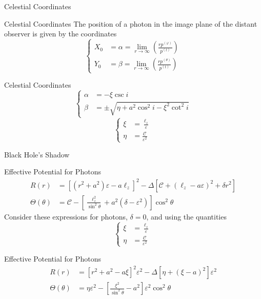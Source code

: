 \documentclass{beamer}
\begin{document}
\begin{darkframes}
\begin{frame}
	\huge
    {Celestial Coordinates}
\end{frame}

\begin{frame}{Celestial Coordinates}
	The position of a photon in the image plane of the distant observer is given by the coordinates 
	\[\begin{cases}
	X_0 &= \alpha = \lim_{r\rightarrow\infty} \left( \frac{rp^{(\varphi)}}{p^{(t)}} \right) \\
	Y_0 &= \beta = \lim_{r\rightarrow\infty} \left( \frac{rp^{(\theta)}}{p^{(t)}} \right)
	\end{cases}\]
\end{frame}

\begin{frame}{Celestial Coordinates}
	\[\begin{cases}
	\alpha &= -\xi \csc i\\	
	\beta &= \pm \sqrt{\eta + a^2 \cos^2 i - \xi^2 \cot^2 i}
	\end{cases}\]
	\pause
	\[\begin{cases}
    \xi &= \frac{\ell_z}{\varepsilon}\\
    \eta &= \frac{\mathcal{C}}{\varepsilon^2}
	\end{cases}\]
\end{frame}


\begin{frame}
	\huge
    {Black Hole's Shadow}
\end{frame}

\begin{frame}{Effective Potential for Photons}
    \begin{align*}
    R(r) &= \left[ (r^2 +a^2) \varepsilon - a \ell_z \right]^2 - \Delta \left[\mathcal{C} + (\ell_z - a \varepsilon)^2 + \delta r^2 \right]\\
	\Theta(\theta) &= \mathcal{C} - \left[ \frac{\ell_z^2}{\sin^2 \theta} + a^2 \left(\delta - \varepsilon^2 \right) \right] \cos^2 \theta
    \end{align*}
    \pause
    Consider these expressions for photons, $\delta=0$, and using the quantities
    \[\begin{cases}
    \xi &= \frac{\ell_z}{\varepsilon}\\
    \eta &= \frac{\mathcal{C}}{\varepsilon^2}
	\end{cases}\]    
\end{frame}

\begin{frame}{Effective Potential for Photons}
    \begin{align*}
    R(r) &= \left[ r^2 +a^2  - a \xi  \right]^2 \varepsilon^2- \Delta \left[\eta + (\xi - a )^2 \right]\varepsilon^2\\
	\Theta(\theta) &= \eta \varepsilon^2   - \left[ \frac{\xi^2}{\sin^2 \theta} - a^2 \right] \varepsilon^2 \cos^2 \theta
    \end{align*}
  

\end{frame}
\end{darkframes}
\end{document}
